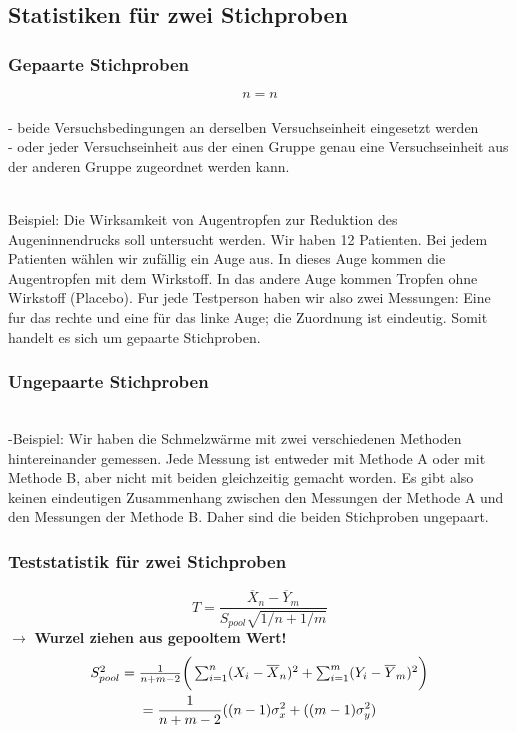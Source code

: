 \documentclass{article}
\begin{document}
\begin{multicols*}{3}
      \subsection{Statistiken für zwei Stichproben}
      \subsubsection{Gepaarte Stichproben}
      $$n= n$$
      \\- beide Versuchsbedingungen an derselben Versuchseinheit eingesetzt werden
      \\- oder jeder Versuchseinheit aus der einen Gruppe genau eine Versuchseinheit
      aus der anderen Gruppe zugeordnet werden kann.

      \\Beispiel:
        Die Wirksamkeit von Augentropfen zur Reduktion des Augeninnendrucks soll
        untersucht werden. Wir haben 12 Patienten. Bei jedem Patienten wählen wir
        zufällig ein Auge aus. In dieses Auge kommen die Augentropfen mit dem Wirkstoff.
        In das andere Auge kommen Tropfen ohne Wirkstoff (Placebo). Fur jede
        Testperson haben wir also zwei Messungen: Eine fur das rechte und eine für
        das linke Auge; die Zuordnung ist eindeutig. Somit handelt es sich um gepaarte
        Stichproben.

      \subsubsection{Ungepaarte Stichproben}

      \\-Beispiel:
        Wir haben die
        Schmelzwärme mit zwei verschiedenen Methoden hintereinander gemessen. Jede
        Messung ist entweder mit Methode A oder mit Methode B, aber nicht mit beiden
        gleichzeitig gemacht worden. Es gibt also keinen eindeutigen Zusammenhang
        zwischen den Messungen der Methode A und den Messungen der Methode B.
        Daher sind die beiden Stichproben ungepaart.

      \subsubsection{Teststatistik für zwei Stichproben}
      $$T = \frac{\overline{X}_n-\overline{Y}_m}{S_{pool}\sqrt{1/n+1/m}}$$
      $\rightarrow$ \textbf{Wurzel ziehen aus gepooltem Wert!}
    \begin{gather}
      $$S^2_{pool} = \frac{1}{n+m-2}\bigg( \sum_{i=1}^{n}(X_i-\overline{X}_n)^2 + \sum_{i=1}^{m}(Y_i-\overline{Y}_m)^2\bigg)
      \\ = \frac{1}{n+m-2}((n-1)\sigma_x^2+((m-1)\sigma_y^2)$$
    \end{gather}

\end{multicols*}
\end{document}
